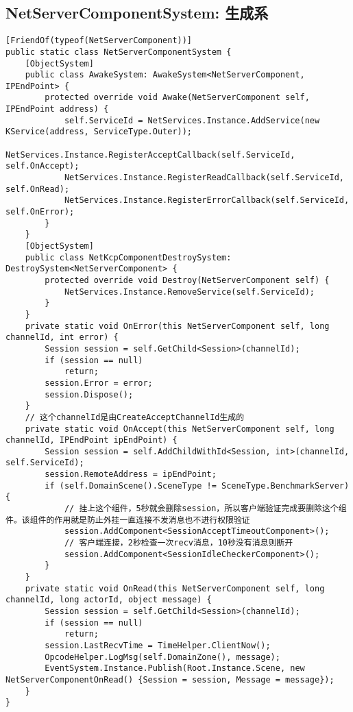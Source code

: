 \documentclass[9pt, b5paper]{article}
\begin{document}
\subsection{NetServerComponentSystem: 生成系}
\label{sec-1-4}
\begin{verbatim}
[FriendOf(typeof(NetServerComponent))]
public static class NetServerComponentSystem {
    [ObjectSystem]
    public class AwakeSystem: AwakeSystem<NetServerComponent, IPEndPoint> {
        protected override void Awake(NetServerComponent self, IPEndPoint address) {
            self.ServiceId = NetServices.Instance.AddService(new KService(address, ServiceType.Outer));
            NetServices.Instance.RegisterAcceptCallback(self.ServiceId, self.OnAccept);
            NetServices.Instance.RegisterReadCallback(self.ServiceId, self.OnRead);
            NetServices.Instance.RegisterErrorCallback(self.ServiceId, self.OnError);
        }
    }
    [ObjectSystem]
    public class NetKcpComponentDestroySystem: DestroySystem<NetServerComponent> {
        protected override void Destroy(NetServerComponent self) {
            NetServices.Instance.RemoveService(self.ServiceId);
        }
    }
    private static void OnError(this NetServerComponent self, long channelId, int error) {
        Session session = self.GetChild<Session>(channelId);
        if (session == null) 
            return;
        session.Error = error;
        session.Dispose();
    }
    // 这个channelId是由CreateAcceptChannelId生成的
    private static void OnAccept(this NetServerComponent self, long channelId, IPEndPoint ipEndPoint) {
        Session session = self.AddChildWithId<Session, int>(channelId, self.ServiceId);
        session.RemoteAddress = ipEndPoint;
        if (self.DomainScene().SceneType != SceneType.BenchmarkServer) {
            // 挂上这个组件，5秒就会删除session，所以客户端验证完成要删除这个组件。该组件的作用就是防止外挂一直连接不发消息也不进行权限验证
            session.AddComponent<SessionAcceptTimeoutComponent>();
            // 客户端连接，2秒检查一次recv消息，10秒没有消息则断开
            session.AddComponent<SessionIdleCheckerComponent>();
        }
    }
    private static void OnRead(this NetServerComponent self, long channelId, long actorId, object message) {
        Session session = self.GetChild<Session>(channelId);
        if (session == null) 
            return;
        session.LastRecvTime = TimeHelper.ClientNow();
        OpcodeHelper.LogMsg(self.DomainZone(), message);
        EventSystem.Instance.Publish(Root.Instance.Scene, new NetServerComponentOnRead() {Session = session, Message = message});
    }
}
\end{verbatim}
\end{document}

